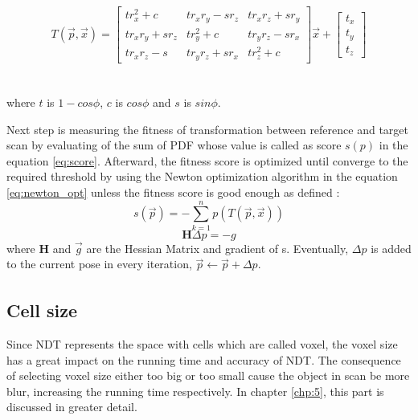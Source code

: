 \\
\\
\begin{equation}
T(\vec{p},\vec{x})=
\begin{bmatrix}
tr_x^2+c		&tr_xr_y-sr_z	&tr_xr_z+sr_y\\
tr_xr_y+sr_z	&tr_y^2+c		&tr_yr_z-sr_x\\
tr_xr_z-s		&tr_yr_z+sr_x	&tr_z^2+c
\end{bmatrix}\vec{x}+ 
\begin{bmatrix}
t_x\\
t_y\\
t_z
\end{bmatrix}
\end{equation}
\\
\\
where $t$ is $1-cos\phi$, $c$ is $cos\phi$ and $s$ is $sin\phi$.
\par Next step is measuring the fitness of transformation between reference and target scan by evaluating of the sum of PDF whose value is called as score $s(p)$ in the equation \ref{eq:score}. Afterward, the fitness score is optimized until converge to the required threshold by using the Newton optimization algorithm in the equation \ref{eq:newton_opt} unless the fitness score is good enough as defined \cite{3dndt}:
\begin{equation}\label{eq:score}
    s(\vec p)=-\sum_{k=1}^np(T(\vec{p},\vec{x}))
\end{equation}
\begin{equation}\label{eq:newton_opt}
    \textbf{H}\Delta p =-g
\end{equation}
where \textbf{H} and $\vec{g}$ are the Hessian Matrix and gradient of s. Eventually, $\Delta p$ is added to the current pose in every iteration, $\vec p \xleftarrow[]{} \vec p+\Delta p$.

\subsection*{Cell size}
Since NDT represents the space with cells which are called voxel, the voxel size has a great impact on the running time and accuracy of NDT. The consequence of selecting voxel size either too big or too small cause the object in scan be more blur, increasing the running time respectively. In chapter \ref{chp:5}, this part is discussed in greater detail.

